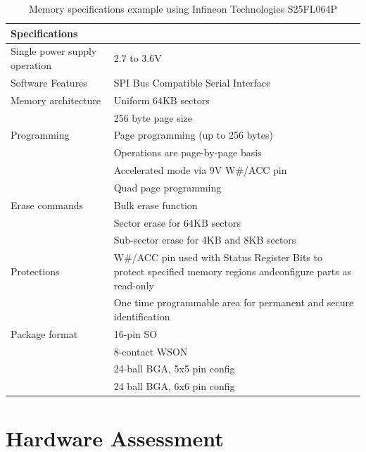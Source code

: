 \begin{table}[H]
  \centering
  \begin{tabular}{|p{6cm}|p{9cm}|}
    \hline\rowcolor{gray!30}

    \textbf{Specifications} &  \\
    \hline

    Single power supply operation & 2.7 to 3.6V \\
    \hline

    Software Features & SPI Bus Compatible Serial Interface \\
    \hline

    Memory architecture & Uniform 64KB sectors \\
    & 256 byte page size \\
    \hline

    Programming & Page programming (up to 256 bytes) \\
    & Operations are page-by-page basis \\
    & Accelerated mode via 9V W\#/ACC pin \\
    & Quad page programming \\
    \hline

    Erase commands & Bulk erase function \\
     & Sector erase for 64KB sectors \\
     & Sub-sector erase for 4KB and 8KB sectors \\
    \hline

    Protections & W\#/ACC pin used with Status Register Bits to protect specified memory regions andconfigure parts as read-only \\
    & One time programmable area for permanent and secure identification \\
    \hline

    Package format & 16-pin SO \\
    & 8-contact WSON \\
    & 24-ball BGA, 5x5 pin config \\
    & 24 ball BGA, 6x6 pin config \\
    \hline

  \end{tabular}
  \caption{Memory specifications example using Infineon Technologies S25FL064P \autocite{S25FL064PSeriesFlash}}
  \label{fig:memory_specs}%
\end{table}

\section{Hardware Assessment} \label{hardwareassessment}

